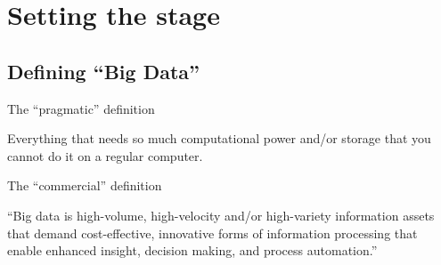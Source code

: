 \documentclass[handout]{beamer}
\begin{document}
\section{Setting the stage}

\subsection{Defining ``Big Data''}

{
	\begin{frame}[plain]
	\end{frame}
}

\begin{frame}{The ``pragmatic'' definition }
	\begin{block}{}
Everything that needs so much computational power and/or storage that you cannot do it on a regular computer.
	\end{block}
\end{frame}



\begin{frame}{The ``commercial'' definition }
	\begin{block}{\textcite{gartner}}
``Big data is high-volume, high-velocity and/or high-variety information assets that demand cost-effective, innovative forms of information processing that enable enhanced insight, decision making, and process automation.''
	\end{block}
\end{frame}
\end{document}
